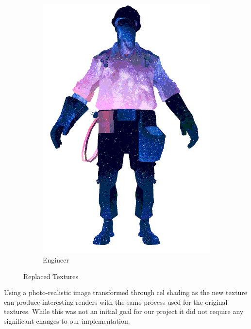 \begin{figure}[h]
\begin{subfigure}[b]{0.2\textwidth}
        \includegraphics[width=\textwidth]{img/textures/TextureReplacement.png}
        \caption{Engineer}
        \label{fig:TextureReplacement}
    \end{subfigure}
    \caption{Replaced Textures}
    \label{fig:TexturesEngineer}
\end{figure}

Using a photo-realistic image transformed through cel shading as the new texture can produce interesting renders with the same process used for the original textures. While this was not an initial goal for our project it did not require any significant changes to our implementation.